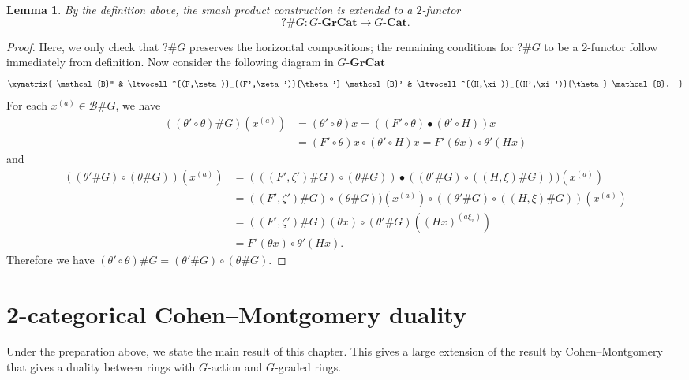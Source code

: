\documentclass{surv-l}
\numberwithin{equation}{chapter}
\numberwithin{figure}{chapter}
\theoremstyle{plain}
\newtheorem{lem}[thm]{Lemma}
\theoremstyle{definition}
\theoremstyle{remark}
\newcommand{\GGrCat}{G\text{-}\mathbf{GrCat}}
\begin{document}
\begin{lem}
By the definition above, the smash product construction
is extended to a $2$-functor
\[
?\#G\colon G\text{-}\mathbf{GrCat}\to G\text{-}\mathbf{Cat}.
\]
\end{lem}

\begin{proof}
Here, we only check that $?\#G$ preserves the horizontal compositions;
the remaining conditions for
$?\#G$ to be a 2-functor follow immediately from
definition.
Now consider the following diagram in $\GGrCat$
\begin{equation*}
\xymatrix{
\mathcal{B}'' & \ltwocell^{(F,\zeta)}_{(F',\zeta')}{\theta'} \mathcal{B}' & \ltwocell^{(H,\xi)}_{(H',\xi')}{\theta} \mathcal{B}.
}
\end{equation*}
For each $x^{(a)}\in\mathcal{B}\#G$, we have
\[
\begin{aligned}
((\theta' \circ \theta)\#G)(x^{(a)})&=(\theta' \circ \theta)x
= ((F'\circ\theta) \bullet (\theta' \circ H))x\\
&= (F'\circ\theta)x \circ (\theta' \circ H)x = F'(\theta x) \circ \theta'(Hx)
\end{aligned}
\]
and
\begin{equation*}
\begin{aligned}
((\theta'\#G)\circ (\theta\#G))(x^{(a)})
&= (((F',\zeta')\#G)\circ (\theta\#G))\bullet ((\theta'\#G)\circ ((H,\xi)\#G)))(x^{(a)})\\
&= ((F',\zeta')\#G)\!\circ\! (\theta\#G))(x^{(a)})\!\circ\!((\theta'\#G)\!\circ\! ((H,\xi)\#G))(x^{(a)})\\
&= ((F',\zeta')\#G)(\theta x)\circ (\theta'\#G)((Hx)^{(a\xi_{x})})\\
&= F'(\theta x)\circ \theta'(Hx).
 \end{aligned}
 \end{equation*}
Therefore we have $(\theta'\circ\theta)\#G=(\theta'\#G)\circ (\theta\#G)$.
\end{proof}

\section{2-categorical Cohen--Montgomery duality}

Under the preparation above, we state the main result of this chapter.
This gives a large extension of the result by Cohen--Montgomery \cite{Co-Mo}
that gives a duality between rings with $G$-action and $G$-graded rings.
\end{document}
